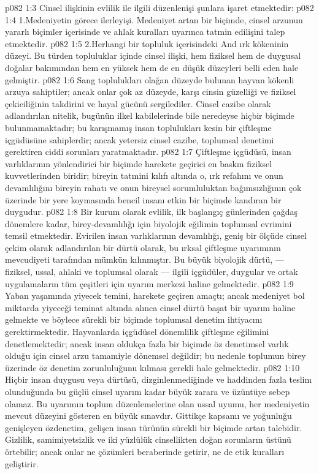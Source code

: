 \vs p082 1:3 Cinsel ilişkinin evlilik ile ilgili düzenlenişi şunlara işaret etmektedir:
\vs p082 1:4 1.\bibnobreakspace Medeniyetin görece ilerleyişi. Medeniyet artan bir biçimde, cinsel arzunun yararlı biçimler içerisinde ve ahlak kuralları uyarınca tatmin edilişini talep etmektedir.
\vs p082 1:5 2.\bibnobreakspace Herhangi bir topluluk içerisindeki And ırk kökeninin düzeyi. Bu türden topluluklar içinde cinsel ilişki, hem fiziksel hem de duygusal doğalar bakımından hem en yüksek hem de en düşük düzeyleri belli eden hale gelmiştir.
\vs p082 1:6 Sang toplulukları olağan düzeyde bulunan hayvan kökenli arzuya sahiptiler; ancak onlar çok az düzeyde, karşı cinsin güzelliği ve fiziksel çekiciliğinin takdirini ve hayal gücünü sergilediler. Cinsel cazibe olarak adlandırılan nitelik, bugünün ilkel kabilelerinde bile neredeyse hiçbir biçimde bulunmamaktadır; bu karışmamış insan toplulukları kesin bir çiftleşme içgüdüsüne sahiplerdir; ancak yetersiz cinsel cazibe, toplumsal denetimi gerektiren ciddi sorunları yaratmaktadır.
\vs p082 1:7 Çiftleşme içgüdüsü, insan varlıklarının yönlendirici bir biçimde harekete geçirici en baskın fiziksel kuvvetlerinden biridir; bireyin tatmini kılıfı altında o, ırk refahını ve onun devamlılığını bireyin rahatı ve onun bireysel sorumluluktan bağımsızlığının çok üzerinde bir yere koymasında bencil insanı etkin bir biçimde kandıran bir duygudur.
\vs p082 1:8 Bir kurum olarak evlilik, ilk başlangıç günlerinden çağdaş dönemlere kadar, birey\hyp{}devamlılığı için biyolojik eğilimin toplumsal evrimini temsil etmektedir. Evirilen insan varlıklarının devamlılığı, geniş bir ölçüde cinsel çekim olarak adlandırılan bir dürtü olarak, bu ırksal çiftleşme uyarımının mevcudiyeti tarafından mümkün kılınmıştır. Bu büyük biyolojik dürtü, --- fiziksel, ussal, ahlaki ve toplumsal olarak --- ilgili içgüdüler, duygular ve ortak uygulamaların tüm çeşitleri için uyarım merkezi haline gelmektedir.
\vs p082 1:9 Yaban yaşamında yiyecek temini, harekete geçiren amaçtı; ancak medeniyet bol miktarda yiyeceği teminat altında alınca cinsel dürtü başat bir uyarım haline gelmekte ve böylece sürekli bir biçimde toplumsal denetim ihtiyacını gerektirmektedir. Hayvanlarda içgüdüsel dönemlilik çiftleşme eğilimini denetlemektedir; ancak insan oldukça fazla bir biçimde öz denetimsel varlık olduğu için cinsel arzu tamamiyle dönemsel değildir; bu nedenle toplumun birey üzerinde öz denetim zorunluluğunu kılması gerekli hale gelmektedir.
\vs p082 1:10 Hiçbir insan duygusu veya dürtüsü, dizginlenmediğinde ve haddinden fazla teslim olunduğunda bu güçlü cinsel uyarım kadar büyük zarara ve üzüntüye sebep olamaz. Bu uyarımın toplum düzenlemelerine olan ussal uyumu, her medeniyetin mevcut düzeyini gösteren en büyük sınavdır. Gittikçe kapsamı ve yoğunluğu genişleyen özdenetim, gelişen insan türünün sürekli bir biçimde artan talebidir. Gizlilik, samimiyetsizlik ve iki yüzlülük cinsellikten doğan sorunların üstünü örtebilir; ancak onlar ne çözümleri beraberinde getirir, ne de etik kuralları geliştirir.

